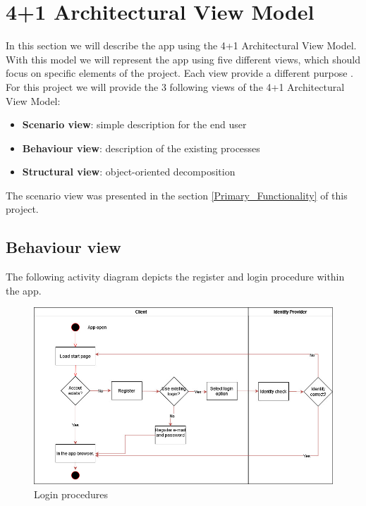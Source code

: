 \section{4+1 Architectural View Model}


In this section we will describe the \gls{app} using the 4+1 Architectural View Model. With this model we will represent
the \gls{app} using five different views, which should focus on specific elements of the project. Each view provide
a different purpose \cite{refart:KR41}. For this project we will provide the 3 following views of the 4+1 Architectural View 
Model:

\begin{itemize}
    \item \textbf{Scenario view}: simple description for the end user 
    \item \textbf{Behaviour view}: description of the existing processes
    \item \textbf{Structural view}: object-oriented decomposition
\end{itemize}

The scenario view was presented in the section \ref{Primary_Functionality} of this project.

\newpage
\subsection{Behaviour view}
The following \gls{activity diagram} depicts the register and login procedure within the app.

\begin{figure}[H]
    \centering
    \includegraphics[width=1\textwidth]{assets/login_AC.jpg}
    \caption{Login procedures}
    \label{fig:login_register}
\end{figure}

